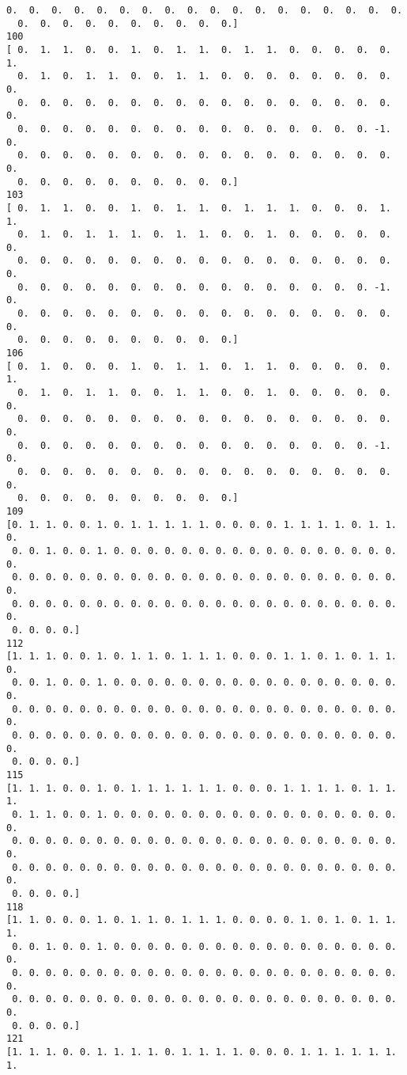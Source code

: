 \documentclass[11pt]{article}
\begin{document}
\begin{Verbatim}[commandchars=\\\{\}]
  0.  0.  0.  0.  0.  0.  0.  0.  0.  0.  0.  0.  0.  0.  0.  0.  0.  0.
  0.  0.  0.  0.  0.  0.  0.  0.  0.  0.]
100
[ 0.  1.  1.  0.  0.  1.  0.  1.  1.  0.  1.  1.  0.  0.  0.  0.  0.  1.
  0.  1.  0.  1.  1.  0.  0.  1.  1.  0.  0.  0.  0.  0.  0.  0.  0.  0.
  0.  0.  0.  0.  0.  0.  0.  0.  0.  0.  0.  0.  0.  0.  0.  0.  0.  0.
  0.  0.  0.  0.  0.  0.  0.  0.  0.  0.  0.  0.  0.  0.  0.  0. -1.  0.
  0.  0.  0.  0.  0.  0.  0.  0.  0.  0.  0.  0.  0.  0.  0.  0.  0.  0.
  0.  0.  0.  0.  0.  0.  0.  0.  0.  0.]
103
[ 0.  1.  1.  0.  0.  1.  0.  1.  1.  0.  1.  1.  1.  0.  0.  0.  1.  1.
  0.  1.  0.  1.  1.  1.  0.  1.  1.  0.  0.  1.  0.  0.  0.  0.  0.  0.
  0.  0.  0.  0.  0.  0.  0.  0.  0.  0.  0.  0.  0.  0.  0.  0.  0.  0.
  0.  0.  0.  0.  0.  0.  0.  0.  0.  0.  0.  0.  0.  0.  0.  0. -1.  0.
  0.  0.  0.  0.  0.  0.  0.  0.  0.  0.  0.  0.  0.  0.  0.  0.  0.  0.
  0.  0.  0.  0.  0.  0.  0.  0.  0.  0.]
106
[ 0.  1.  0.  0.  0.  1.  0.  1.  1.  0.  1.  1.  0.  0.  0.  0.  0.  1.
  0.  1.  0.  1.  1.  0.  0.  1.  1.  0.  0.  1.  0.  0.  0.  0.  0.  0.
  0.  0.  0.  0.  0.  0.  0.  0.  0.  0.  0.  0.  0.  0.  0.  0.  0.  0.
  0.  0.  0.  0.  0.  0.  0.  0.  0.  0.  0.  0.  0.  0.  0.  0. -1.  0.
  0.  0.  0.  0.  0.  0.  0.  0.  0.  0.  0.  0.  0.  0.  0.  0.  0.  0.
  0.  0.  0.  0.  0.  0.  0.  0.  0.  0.]
109
[0. 1. 1. 0. 0. 1. 0. 1. 1. 1. 1. 1. 0. 0. 0. 0. 1. 1. 1. 1. 0. 1. 1. 0.
 0. 0. 1. 0. 0. 1. 0. 0. 0. 0. 0. 0. 0. 0. 0. 0. 0. 0. 0. 0. 0. 0. 0. 0.
 0. 0. 0. 0. 0. 0. 0. 0. 0. 0. 0. 0. 0. 0. 0. 0. 0. 0. 0. 0. 0. 0. 0. 0.
 0. 0. 0. 0. 0. 0. 0. 0. 0. 0. 0. 0. 0. 0. 0. 0. 0. 0. 0. 0. 0. 0. 0. 0.
 0. 0. 0. 0.]
112
[1. 1. 1. 0. 0. 1. 0. 1. 1. 0. 1. 1. 1. 0. 0. 0. 1. 1. 0. 1. 0. 1. 1. 0.
 0. 0. 1. 0. 0. 1. 0. 0. 0. 0. 0. 0. 0. 0. 0. 0. 0. 0. 0. 0. 0. 0. 0. 0.
 0. 0. 0. 0. 0. 0. 0. 0. 0. 0. 0. 0. 0. 0. 0. 0. 0. 0. 0. 0. 0. 0. 0. 0.
 0. 0. 0. 0. 0. 0. 0. 0. 0. 0. 0. 0. 0. 0. 0. 0. 0. 0. 0. 0. 0. 0. 0. 0.
 0. 0. 0. 0.]
115
[1. 1. 1. 0. 0. 1. 0. 1. 1. 1. 1. 1. 1. 0. 0. 0. 1. 1. 1. 1. 0. 1. 1. 1.
 0. 1. 1. 0. 0. 1. 0. 0. 0. 0. 0. 0. 0. 0. 0. 0. 0. 0. 0. 0. 0. 0. 0. 0.
 0. 0. 0. 0. 0. 0. 0. 0. 0. 0. 0. 0. 0. 0. 0. 0. 0. 0. 0. 0. 0. 0. 0. 0.
 0. 0. 0. 0. 0. 0. 0. 0. 0. 0. 0. 0. 0. 0. 0. 0. 0. 0. 0. 0. 0. 0. 0. 0.
 0. 0. 0. 0.]
118
[1. 1. 0. 0. 0. 1. 0. 1. 1. 0. 1. 1. 1. 0. 0. 0. 0. 1. 0. 1. 0. 1. 1. 1.
 0. 0. 1. 0. 0. 1. 0. 0. 0. 0. 0. 0. 0. 0. 0. 0. 0. 0. 0. 0. 0. 0. 0. 0.
 0. 0. 0. 0. 0. 0. 0. 0. 0. 0. 0. 0. 0. 0. 0. 0. 0. 0. 0. 0. 0. 0. 0. 0.
 0. 0. 0. 0. 0. 0. 0. 0. 0. 0. 0. 0. 0. 0. 0. 0. 0. 0. 0. 0. 0. 0. 0. 0.
 0. 0. 0. 0.]
121
[1. 1. 1. 0. 0. 1. 1. 1. 1. 0. 1. 1. 1. 1. 0. 0. 0. 1. 1. 1. 1. 1. 1. 1.

\end{Verbatim}
\end{document}
